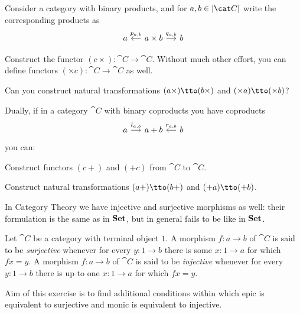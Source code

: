 \begin{exercise}
Consider a category with binary products, and for \(a, b \in \obj{\cat C}\) write the corresponding products as
\[\begin{tikzcd}[column sep=small]
a & a \times b \ar["{p_{a,b}}", l, swap] \ar["{q_{a,b}}", r] & b
\end{tikzcd}\]
\begin{tcbenum}
\item Construct the functor \((c \times) : \cat C \to \cat C\). Without much other effort, you can define functors \((\times c) : \cat C \to \cat C\) as well.
\item Can you construct natural transformations \((a \times) \tto (b \times)\) and \((\times a) \tto (\times b)\)?
\end{tcbenum}
Dually, if in a category \(\cat C\) with binary coproducts you have coproducts
\[\begin{tikzcd}[column sep=small]
a \ar["{l_{a,b}}", r] & a+b & b \ar["{r_{a,b}}", l, swap]
\end{tikzcd}\]
you can:
\begin{tcbenum}
\item Construct functors \((c +)\) and \((+ c)\) from \(\cat C\) to \(\cat C\).
\item Construct natural transformations \((a +) \tto (b +)\) and \((+ a) \tto (+ b)\).
\end{tcbenum}
\end{exercise}

In Category Theory we have injective and surjective morphisms as well: their formulation is the same as in \(\mathbf{Set}\), but in general fails to be like in \(\mathbf{Set}\). 

\begin{definition}
Let \(\cat C\) be a category with terminal object \(1\). A morphism \(f : a \to b\) of \(\cat C\) is said to be {\em surjective} whenever for every \(y : 1 \to b\) there is some \(x : 1 \to a\) for which \(f x = y\). A morphism \(f : a \to b\) of \(\cat C\) is said to be {\em injective} whenever for every \(y : 1 \to b\) there is up to one \(x : 1 \to a\) for which \(f x = y\).
\end{definition}

Aim of this exercise is to find additional conditions within which epic is equivalent to surjective and monic is equivalent to injective.

